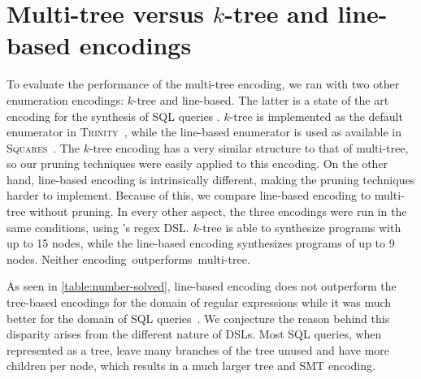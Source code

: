 \section{\texorpdfstring{Multi-tree versus \(k\)-tree and line-based encodings}{Multi-tree versus k-tree and line-based encodings}}\label{sec:multi-tree-vs-encodings}
%

To evaluate the performance of the multi-tree encoding, we ran \Forest{} with two other enumeration encodings: \(k\)-tree and line-based.
The latter is a state of the art encoding for the synthesis of SQL queries \cite{Orvalho19}. \(k\)-tree is implemented as the default enumerator in \textsc{Trinity}~\cite{trinity19}, while the line-based enumerator is used as available in \textsc{Squares}~\cite{squares-webpage}. The \(k\)-tree encoding has a very similar structure to that of multi-tree, so our pruning techniques were easily applied to this encoding. On the other hand, line-based encoding is intrinsically different, making the pruning techniques harder to implement. Because of this, we compare line-based encoding to multi-tree without pruning.
In every other aspect, the three encodings were run in the same conditions, using \Forest{}'s regex \ac{DSL}.
\(k\)-tree is able to synthesize programs with up to 15 nodes, while the line-based encoding synthesizes programs of up to 9 nodes. Neither encoding~outperforms~multi-tree. %

As seen in \autoref{table:number-solved}, line-based encoding does not outperform the tree-based encodings for the domain of regular expressions while it was much better for the domain of SQL queries~\cite{Orvalho19}. We conjecture the reason behind this disparity arises from the different nature of DSLs. Most SQL queries, when represented as a tree, leave many branches of the tree unused and have more children per node, which results in a much larger tree and SMT encoding.


